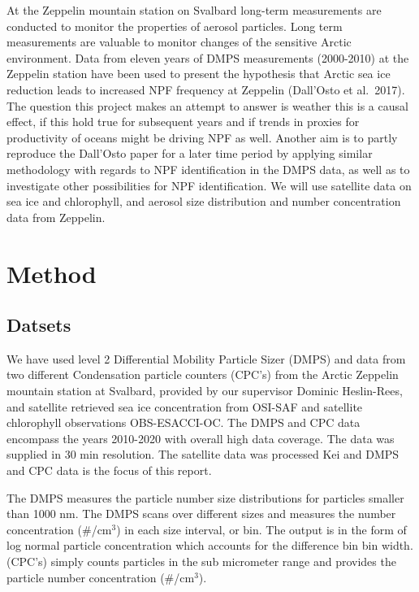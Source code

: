 \documentclass[11pt]{article}
\begin{document}
At the Zeppelin mountain station on Svalbard long-term measurements are
conducted to monitor the properties of aerosol particles. Long term
measurements are valuable to monitor changes of the sensitive Arctic
environment. Data from eleven years of DMPS measurements (2000-2010) at
the Zeppelin station have been used to present the hypothesis that
Arctic sea ice reduction leads to increased NPF frequency at Zeppelin
(Dall'Osto et al.~2017). The question this project makes an attempt to
answer is weather this is a causal effect, if this hold true for
subsequent years and if trends in proxies for productivity of oceans
might be driving NPF as well. Another aim is to partly reproduce the
Dall'Osto paper for a later time period by applying similar methodology
with regards to NPF identification in the DMPS data, as well as to
investigate other possibilities for NPF identification. We will use
satellite data on sea ice and chlorophyll, and aerosol size distribution
and number concentration data from Zeppelin.

    \hypertarget{method}{%
\section{Method}\label{method}}

\hypertarget{datsets}{%
\subsection{Datsets}\label{datsets}}

We have used level 2 Differential Mobility Particle Sizer (DMPS) and
data from two different Condensation particle counters (CPC's) from the
Arctic Zeppelin mountain station at Svalbard, provided by our supervisor
Dominic Heslin-Rees, and satellite retrieved sea ice concentration from
OSI-SAF and satellite chlorophyll observations OBS-ESACCI-OC. The DMPS
and CPC data encompass the years 2010-2020 with overall high data
coverage. The data was supplied in 30 min resolution. The satellite data
was processed Kei and DMPS and CPC data is the focus of this report.

The DMPS measures the particle number size distributions for particles
smaller than 1000 nm. The DMPS scans over different sizes and measures
the number concentration (\#/cm\(^3\)) in each size interval, or bin.
The output is in the form of log normal particle concentration which
accounts for the difference bin bin width. (CPC's) simply counts
particles in the sub micrometer range and provides the particle number
concentration (\#/cm\(^3\)).
\end{document}
